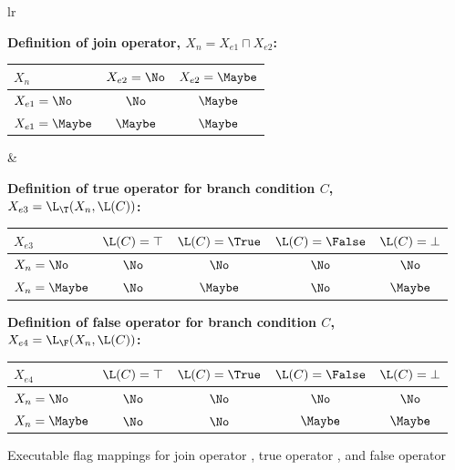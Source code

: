 \begin{figure}%
\begin{tabular}{lr}
\begin{minipage}{3.75in}
{\bf Definition of join operator, $X_n = X_{e1} \sqcap X_{e2}$:}

\medskip

\begin{tabular}{|l||c|c|}
\hline
$X_n$ & $X_{e2} = \No$ & $X_{e2} = \Maybe$  \\
\hline \hline 
$X_{e1} = \No$ & $\No$ & $\Maybe$  \\
\hline
$X_{e1} = \Maybe$ & $\Maybe$ & $\Maybe$  \\
\hline
\end{tabular}
\end{minipage}
&
\begin{minipage}{1.0in}
\centerline{}
\end{minipage}
\end{tabular}

\bigskip
\bigskip

{\bf Definition of true operator for branch condition $C$,\\
$X_{e3} = \L_{\T}(X_n,\L(C))$:}

\medskip

\begin{tabular}{|l||c|c|c|c|}
\hline
$X_{e3}$ & $\L(C) = \top$ & $\L(C) = \True$ & $\L(C) = \False$ & $\L(C) = \bot$ \\
\hline \hline
$X_n = \No$ & $\No$ & $\No$ & $\No$ & $\No$ \\
\hline
$X_n = \Maybe $ & $\No$ & $\Maybe$ & $\No$ & $\Maybe$ \\
\hline
\end{tabular}

\bigskip
\bigskip

{\bf
Definition of false operator for branch condition $C$,\\
$X_{e4} = \L_{\F}(X_n, \L(C))$:}

\medskip

\begin{tabular}{|l||c|c|c|c|}
\hline
 $X_{e4}$ & $\L(C) = \top$ & $\L(C) = \True$ & $\L(C) = \False$ & $\L(C) = \bot$ \\
\hline \hline
$X_n = \No$ & $\No$ & $\No$ & $\No$ & $\No$ \\
\hline
$X_n = \Maybe$ & $\No$ & $\No$ & $\Maybe$ & $\Maybe$ \\
\hline
\end{tabular}
\caption{Executable flag mappings for join operator \protect{$(\sqcap)$},
true operator \protect{$(\L_{\T})$}, and false operator \protect{$(\L_{\F})$}}
\label{fig:mappings}
\end{figure}

